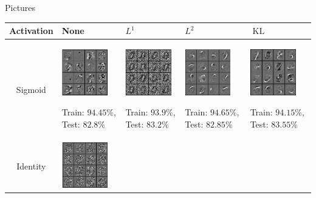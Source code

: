 \documentclass{beamer}
\DeclareMathOperator{\KL}{KL}
\begin{document}
\footnotesize
\begin{frame}{Pictures}
\begin{table}[h!]
\centering
\begin{tabular}{ | c | m{2cm} | m{2cm} | m{2cm} | m{2cm}| }
\hline
Activation & None & $L^1$ & $L^2$ & $\KL$ \\ \hline
Sigmoid
&
\begin{minipage}{.3\textwidth}
\includegraphics[width=20mm, height=20mm]{fig3}
\end{minipage}
\tiny
Train: $94.45\%$, Test: $82.8\%$ 
& 
\begin{minipage}{.3\textwidth}
\includegraphics[width=20mm, height=20mm]{fig1}
\end{minipage}
\tiny
Train: $93.9\%$, Test: $83.2\%$ 
& 
\begin{minipage}{.3\textwidth}
\includegraphics[width=20mm, height=20mm]{fig8}
\end{minipage}
\tiny
Train: $94.65\%$, Test: $82.85\%$ 
& 
\begin{minipage}{.3\textwidth}
\includegraphics[width=20mm, height=20mm]{fig2}
\end{minipage}
\tiny
Train: $94.15\%$, Test: $83.55\%$ 
\\ \hline
Identity
&
\begin{minipage}{.3\textwidth}
\includegraphics[width=20mm, height=20mm]{fig6}

\end{minipage}
\end{tabular}
\end{table}
\end{frame}
\end{document}
